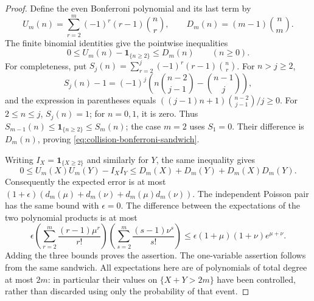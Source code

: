 \documentclass[11pt]{article}
\numberwithin{equation}{section}
\theoremstyle{definition}
\theoremstyle{remark}
\newcommand{\1}{\mathbf 1}
\begin{document}
\begin{proof}
Define the even Bonferroni polynomial and its last term by
\[
 U_m(n)=\sum_{r=2}^{m}(-1)^r(r-1)\binom nr,
 \qquad D_m(n)=(m-1)\binom nm.
\]
The finite binomial identities give the pointwise inequalities
\begin{equation}
\label{eq:collision-bonferroni-sandwich}
 0\le U_m(n)-\mathbf 1_{\{n\ge2\}}\le D_m(n)
 \qquad(n\ge0).
\end{equation}
For completeness, put $S_j(n)=\sum_{r=2}^{j}(-1)^r(r-1)\binom nr$.
For $n>j\ge2$,
\[
 S_j(n)-1=(-1)^j
 \left(n\binom{n-2}{j-1}-\binom{n-1}{j}\right),
\]
and the expression in parentheses equals
$((j-1)n+1)\binom{n-2}{j-1}/j\ge0$.
For $2\le n\le j$, $S_j(n)=1$; for $n=0,1$, it is zero.
Thus $S_{m-1}(n)\le\mathbf 1_{\{n\ge2\}}\le S_m(n)$; the case $m=2$
uses $S_1=0$. Their difference is $D_m(n)$, proving
\eqref{eq:collision-bonferroni-sandwich}.

Writing $I_X=\mathbf 1_{\{X\ge2\}}$ and similarly for $Y$, the same inequality gives
\[
 0\le U_m(X)U_m(Y)-I_XI_Y
 \le D_m(X)+D_m(Y)+D_m(X)D_m(Y).
\]
Consequently the expected error is at most
$(1+\epsilon)(d_m(\mu)+d_m(\nu)+d_m(\mu)d_m(\nu))$.
The independent Poisson pair has the same bound with $\epsilon=0$.
The difference between the expectations of the two polynomial products is
at most
\[
 \epsilon\left(\sum_{r=2}^{m}\frac{(r-1)\mu^r}{r!}\right)
 \left(\sum_{s=2}^{m}\frac{(s-1)\nu^s}{s!}\right)
 \le\epsilon(1+\mu)(1+\nu)e^{\mu+\nu}.
\]
Adding the three bounds proves the assertion. The one-variable assertion
follows from the same sandwich. All expectations here are of polynomials of
total degree at most $2m$: in particular their values on $\{X+Y>2m\}$ have
been controlled, rather than discarded using only the probability of that event.
\end{proof}
\end{document}
